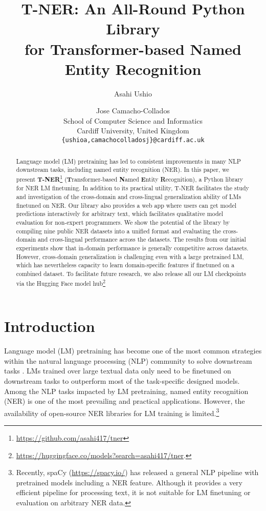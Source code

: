 \documentclass[11pt,a4paper]{article}
\title{T-NER: An All-Round Python Library \\ for Transformer-based Named Entity Recognition}
\author{Asahi Ushio \and Jose Camacho-Collados \\
  School of Computer Science and Informatics \\
  Cardiff University, United Kingdom \\
  {\tt \{ushioa,camachocolladosj\}@cardiff.ac.uk}}
\date{}
\begin{document}
\maketitle



\begin{abstract}
Language model (LM) pretraining has led to consistent improvements in many NLP downstream tasks, including named entity recognition (NER). In this paper, we present {\bf T-NER}\footnote{\url{https://github.com/asahi417/tner}} ({\bf T}ransformer-based {\bf N}amed {\bf E}ntity {\bf R}ecognition), a Python library for NER LM finetuning. In addition to its practical utility, T-NER facilitates the study and investigation of the cross-domain and cross-lingual generalization ability of LMs finetuned on NER. Our library also provides a web app where users can get model predictions interactively for arbitrary text, which facilitates qualitative model evaluation for non-expert programmers. We show the potential of the library by compiling nine public NER datasets into a unified format and evaluating the cross-domain and cross-lingual performance across the datasets. The results from our initial experiments show that in-domain performance is generally competitive across datasets. However, cross-domain generalization is challenging even with a large pretrained LM, which has nevertheless capacity to learn domain-specific features if finetuned on a combined dataset. To facilitate future research, we also release all our LM checkpoints via the Hugging Face model hub\footnote{\url{https://huggingface.co/models?search=asahi417/tner}.
}

\end{abstract}

\section{Introduction}

Language model (LM) pretraining has become one of the most common strategies within the natural language processing (NLP) community to solve downstream tasks \citep{peters-etal-2018-deep, howard-ruder-2018-universal, radford2018improving, radford2019language, devlin2018bert}.
LMs trained over large textual data only need to be finetuned on downstream tasks to outperform most of the task-specific designed models. Among the NLP tasks impacted by LM pretraining, named entity recognition (NER) is one of the most prevailing and practical applications. However, the availability of open-source NER libraries for LM training is limited.\footnote{
Recently, spaCy (\url{https://spacy.io/}) has released a general NLP pipeline with pretrained models including a NER feature. Although it provides a very efficient pipeline for processing text, it is not suitable for LM finetuning or evaluation on arbitrary NER data.} 
\end{document}
